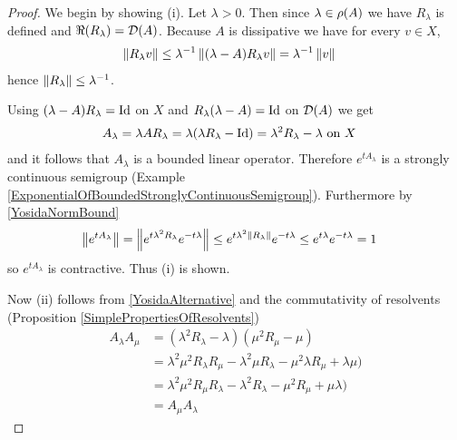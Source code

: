 \begin{proof}
We begin by showing (i).  Let $\lambda > 0$.  Then since $\lambda \in \rho(A)$ we have $R_\lambda$ is defined and $\Re(R_\lambda) = \mathcal{D}(A)$.   Because $A$ is dissipative we have for every $v \in X$,
\begin{align}\label{YosidaNormBound}
\left \lVert R_\lambda v \right \rVert &\leq \lambda^{-1} \left \lVert (\lambda - A)R_\lambda v \right \rVert  = \lambda^{-1} \left \lVert v \right \rVert
\end{align}
hence $\left \lVert R_\lambda \right \rVert \leq \lambda^{-1}$.

Using $(\lambda - A)R_\lambda = \operatorname*{Id}$ on $X$ and $R_\lambda (\lambda -A) = \operatorname*{Id}$ on $\mathcal{D}(A)$ we get 
\begin{align}\label{YosidaAlternative}
A_\lambda &= \lambda A R_\lambda = \lambda (\lambda R_\lambda - \operatorname*{Id}) = \lambda^2 R_\lambda - \lambda \text{ on $X$} 
\end{align}
and it follows that $A_\lambda$ is a bounded linear operator.  Therefore $e^{t A_\lambda}$ is a strongly continuous semigroup (Example \ref{ExponentialOfBoundedStronglyContinuousSemigroup}).  Furthermore by
\eqref{YosidaNormBound}
\begin{align*}
\left \lVert e^{t A_\lambda} \right \rVert &= \left \lVert e^{t \lambda^2 R_\lambda} e^{-t \lambda} \right \rVert \leq e^{t \lambda^2 \left \lVert R_\lambda \right \rVert} e^{-t\lambda} \leq e^{t \lambda} e^{-t\lambda}  = 1
\end{align*}
so $e^{tA_\lambda}$ is contractive.  Thus (i) is shown.

Now (ii) follows from \eqref{YosidaAlternative} and the commutativity of resolvents (Proposition \ref{SimplePropertiesOfResolvents})
\begin{align*}
A_\lambda A_\mu &= (\lambda^2 R_\lambda - \lambda) (\mu^2 R_\mu - \mu) \\
&= \lambda^2 \mu^2 R_\lambda R_\mu - \lambda^2 \mu R_\lambda - \mu^2 \lambda R_\mu +\lambda \mu ) \\
&= \lambda^2 \mu^2 R_\mu R_\lambda - \lambda^2 R_\lambda - \mu^2 R_\mu + \mu \lambda)  \\
&= A_\mu A_\lambda
\end{align*}


\end{proof}
